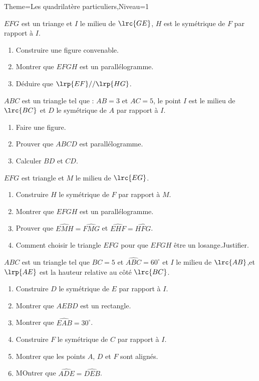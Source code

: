 \documentclass[a4paper,12pt]{article}
\begin{document}
\begin{Maquette}[Fiche]{Theme=Les quadrilatère particuliers,Niveau=1}

\begin{exercice}
$EFG$ est un triange et $I$ le milieu de $\lrc{GE}$, $H$ est le symétrique de $F$ par rapport à $I$.
\begin{enumerate}
\item Construire une figure convenable.
\item Montrer que $EFGH$ est un parallélogramme.
\item Déduire que $\lrp{EF}//\lrp{HG}$.
\end{enumerate}
\end{exercice}

\begin{exercice}
$ABC$ est un triangle tel que : $AB=3$ et $AC=5$, le point $I$ est le milieu de $\lrc{BC}$ et $D$ le symétrique de $A$ par rapport à $I$.
\begin{enumerate}
\item Faire une figure.
\item Prouver que $ABCD$ est parallélogramme.
\item Calculer $BD$ et $CD$.
\end{enumerate}
\end{exercice}

\begin{exercice}
$EFG$ est triangle et $M$ le milieu de $\lrc{EG}$.
\begin{enumerate}
\item Construire $H$ le symétrique de $F$ par rapport à $M$.
\item Montrer que $EFGH$ est un parallélogramme.
\item Prouver que $\widehat{EMH}=\widehat{FMG}$ et $\widehat{EHF}=\widehat{HFG}$.
\item Comment choisir le triangle $EFG$ pour que $EFGH$ être un losange.Justifier.
\end{enumerate}
\end{exercice}

\begin{exercice}%
$ABC$ est un triangle tel que $BC=5$ et $\widehat{ABC}=60^{\circ}$ et $I$ le milieu de $\lrc{AB}$,et $\lrp{AE}$ est la hauteur relative au côté $\lrc{BC}$.
\begin{enumerate}
\item Construire $D$ le symétrique de $E$ par rapport à $I$.
\item Montrer que $AEBD$ est un rectangle.
\item Montrer que $\widehat{EAB}=30^{\circ}$.
\item Construire $F$ le symétrique de $C$ par rapport à $I$.
\item Montrer que les points $A$, $D$ et $F$ sont alignés.
\item MOntrer que $\widehat{ADE}=\widehat{DEB} $.
\end{enumerate}
\end{exercice}


\end{Maquette}
\end{document}
